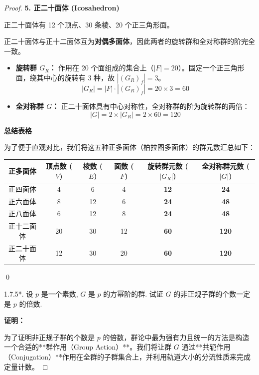\documentclass[]{article}
\begin{document}
\begin{proof}
\bigskip
\noindent \textbf{5. 正二十面体 (Icosahedron)}

正二十面体有 12 个顶点、30 条棱、20 个正三角形面。

正二十面体与正十二面体互为\textbf{对偶多面体}，因此两者的旋转群和全对称群的阶完全一致。
\begin{itemize}
	\item \textbf{旋转群 $G_R$：}
	作用在 20 个面组成的集合上（$|F| = 20$）。固定一个正三角形面，绕其中心的旋转有 3 种，故 $|(G_R)_f| = 3$。
	\[ |G_R| = |F| \cdot |(G_R)_f| = 20 \times 3 = 60 \]
	
	\item \textbf{全对称群 $G$：}
	正二十面体具有中心对称性，全对称群的阶为旋转群的两倍：
	\[ |G| = 2 \times |G_R| = 2 \times 60 = 120 \]
\end{itemize}

\bigskip
\noindent \textbf{总结表格}

为了便于直观对比，我们将这五种正多面体（柏拉图多面体）的群元数汇总如下：

\begin{center}
	\begin{tabular}{|c|c|c|c|c|c|}
		\hline
		\textbf{正多面体} & \textbf{顶点数 ($V$)} & \textbf{棱数 ($E$)} & \textbf{面数 ($F$)} & \textbf{旋转群元数 ($|G_R|$)} & \textbf{全对称群元数 ($|G|$)} \\ \hline
		正四面体 & 4 & 6 & 4 & \textbf{12} & \textbf{24} \\ \hline
		正六面体 & 8 & 12 & 6 & \textbf{24} & \textbf{48} \\ \hline
		正八面体 & 6 & 12 & 8 & \textbf{24} & \textbf{48} \\ \hline
		正十二面体 & 20 & 30 & 12 & \textbf{60} & \textbf{120} \\ \hline
		正二十面体 & 12 & 30 & 20 & \textbf{60} & \textbf{120} \\ \hline
	\end{tabular}
\end{center}

\qed

1.7.5*. 设 $p$ 是一个素数, $G$ 是 $p$ 的方幂阶的群. 试证 $G$ 的非正规子群的个数一定是 $p$ 的倍数. 

\bigskip
\noindent \textbf{证明：} 

为了证明非正规子群的个数是 $p$ 的倍数，群论中最为强有力且统一的方法是构造一个合适的**群作用（Group Action）**。我们将让群 $G$ 通过**共轭作用（Conjugation）**作用在全群的子群集合上，并利用轨道大小的分流性质来完成定量计数。


\end{proof}
\end{document}
